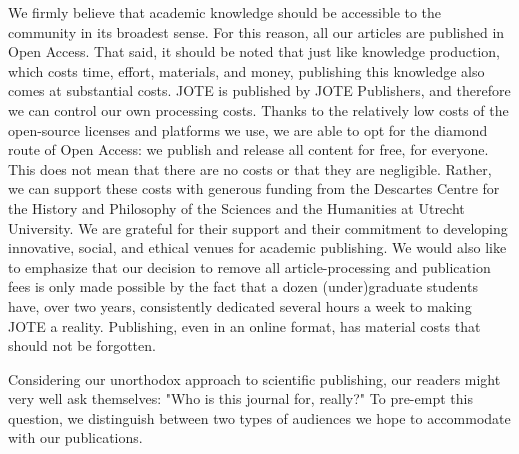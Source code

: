 \documentclass[twocolumn, serif]{jote-article}
\begin{document}
{{{{{{{{{{{\hypertarget{fees-and-funding}{%

We firmly believe that academic knowledge should be accessible to the community in its broadest sense. For this reason, all our articles are published in Open Access. That said, it should be noted that just like knowledge production, which costs time, effort, materials, and money, publishing this knowledge also comes at substantial costs. JOTE is published by JOTE Publishers, and therefore we can control our own processing costs. Thanks to the relatively low costs of the open-source licenses and platforms we use, we are able to opt for the diamond route of Open Access: we publish and release all content for free, for everyone. This does not mean that there are no costs or that they are negligible. Rather, we can support these costs with generous funding from the Descartes Centre for the History and Philosophy of the Sciences and the Humanities at Utrecht University. We are grateful for their support and their commitment to developing innovative, social, and ethical venues for academic publishing. We would also like to emphasize that our decision to remove all article-processing and publication fees is only made possible by the fact that a dozen (under)graduate students have, over two years, consistently dedicated several hours a week to making JOTE a reality. Publishing, even in an online format, has material costs that should not be forgotten.

\hypertarget{who-is-our-audience}{%

Considering our unorthodox approach to scientific publishing, our readers might very well ask themselves: "Who is this journal for, really?" To pre-empt this question, we distinguish between two types of audiences we hope to accommodate with our publications.

}}}}}}}}}}}}}
\end{document}
